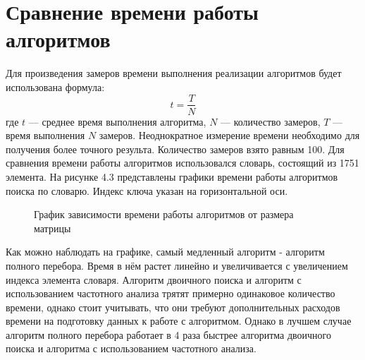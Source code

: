 \documentclass[12pt]{report}
\begin{document}
\newpage
\section{Сравнение времени работы алгоритмов}
Для произведения замеров времени выполнения реализации алгоритмов будет использована формула: \begin{equation}\label{eq:fourierrow}
	t = \frac{T}{N}
\end{equation}
где $t$ — среднее время выполнения алгоритма, $N$ — количество замеров, $T$ — время выполнения $N$ замеров.  
Неоднократное измерение времени необходимо для получения более точного результа. Количество замеров взято равным 100. Для сравнения времени работы алгоритмов использовался словарь, состоящий из 1751 элемента. На рисунке 4.3 представлены графики времени работы алгоритмов поиска по словарю. Индекс ключа указан на горизонтальной оси.

\begin{figure}[ht!]
	\caption{График зависимости времени работы алгоритмов от размера матрицы}
\end{figure}

Как можно наблюдать на графике, самый медленный алгоритм - алгоритм полного перебора. Время в нём растет линейно и увеличивается с увеличением индекса элемента словаря. Алгоритм двоичного поиска и алгоритм с использованием частотного анализа трятят примерно одинаковое количество времени, однако стоит учитывать, что они требуют дополнительных расходов времени на подготовку данных к работе с алгоритмом.
Однако в лучшем случае алгоритм полного перебора работает в 4 раза быстрее алгоритма двоичного поиска и алгоритма с использованием частотного анализа.
\end{document}
